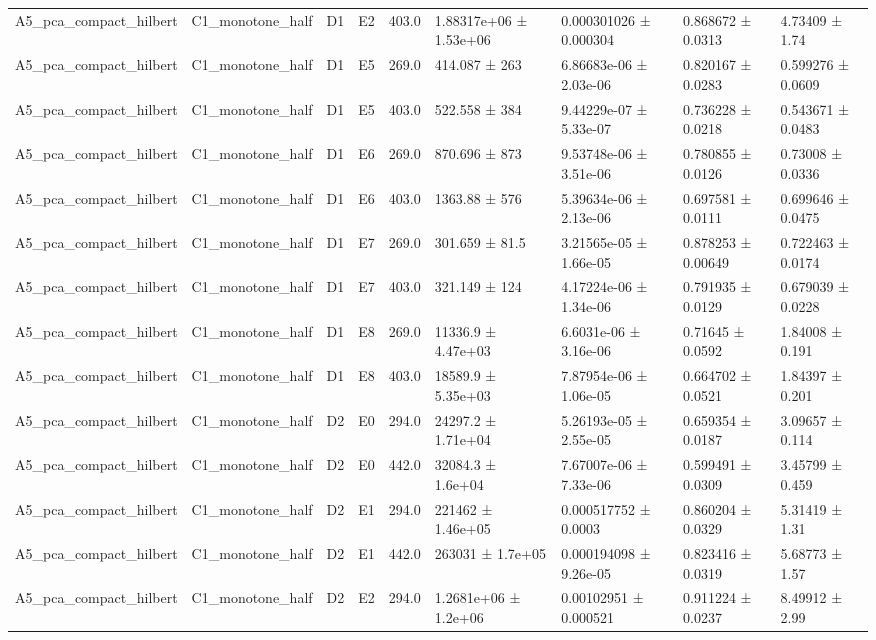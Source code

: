 \begin{table}
\begin{tabular}{lllllllll}
A5\_pca\_compact\_hilbert & C1\_monotone\_half & D1 & E2 & 403.0 & 1.88317e+06 ± 1.53e+06 & 0.000301026 ± 0.000304 & 0.868672 ± 0.0313 & 4.73409 ± 1.74 \\
A5\_pca\_compact\_hilbert & C1\_monotone\_half & D1 & E5 & 269.0 & 414.087 ± 263 & 6.86683e-06 ± 2.03e-06 & 0.820167 ± 0.0283 & 0.599276 ± 0.0609 \\
A5\_pca\_compact\_hilbert & C1\_monotone\_half & D1 & E5 & 403.0 & 522.558 ± 384 & 9.44229e-07 ± 5.33e-07 & 0.736228 ± 0.0218 & 0.543671 ± 0.0483 \\
A5\_pca\_compact\_hilbert & C1\_monotone\_half & D1 & E6 & 269.0 & 870.696 ± 873 & 9.53748e-06 ± 3.51e-06 & 0.780855 ± 0.0126 & 0.73008 ± 0.0336 \\
A5\_pca\_compact\_hilbert & C1\_monotone\_half & D1 & E6 & 403.0 & 1363.88 ± 576 & 5.39634e-06 ± 2.13e-06 & 0.697581 ± 0.0111 & 0.699646 ± 0.0475 \\
A5\_pca\_compact\_hilbert & C1\_monotone\_half & D1 & E7 & 269.0 & 301.659 ± 81.5 & 3.21565e-05 ± 1.66e-05 & 0.878253 ± 0.00649 & 0.722463 ± 0.0174 \\
A5\_pca\_compact\_hilbert & C1\_monotone\_half & D1 & E7 & 403.0 & 321.149 ± 124 & 4.17224e-06 ± 1.34e-06 & 0.791935 ± 0.0129 & 0.679039 ± 0.0228 \\
A5\_pca\_compact\_hilbert & C1\_monotone\_half & D1 & E8 & 269.0 & 11336.9 ± 4.47e+03 & 6.6031e-06 ± 3.16e-06 & 0.71645 ± 0.0592 & 1.84008 ± 0.191 \\
A5\_pca\_compact\_hilbert & C1\_monotone\_half & D1 & E8 & 403.0 & 18589.9 ± 5.35e+03 & 7.87954e-06 ± 1.06e-05 & 0.664702 ± 0.0521 & 1.84397 ± 0.201 \\
A5\_pca\_compact\_hilbert & C1\_monotone\_half & D2 & E0 & 294.0 & 24297.2 ± 1.71e+04 & 5.26193e-05 ± 2.55e-05 & 0.659354 ± 0.0187 & 3.09657 ± 0.114 \\
A5\_pca\_compact\_hilbert & C1\_monotone\_half & D2 & E0 & 442.0 & 32084.3 ± 1.6e+04 & 7.67007e-06 ± 7.33e-06 & 0.599491 ± 0.0309 & 3.45799 ± 0.459 \\
A5\_pca\_compact\_hilbert & C1\_monotone\_half & D2 & E1 & 294.0 & 221462 ± 1.46e+05 & 0.000517752 ± 0.0003 & 0.860204 ± 0.0329 & 5.31419 ± 1.31 \\
A5\_pca\_compact\_hilbert & C1\_monotone\_half & D2 & E1 & 442.0 & 263031 ± 1.7e+05 & 0.000194098 ± 9.26e-05 & 0.823416 ± 0.0319 & 5.68773 ± 1.57 \\
A5\_pca\_compact\_hilbert & C1\_monotone\_half & D2 & E2 & 294.0 & 1.2681e+06 ± 1.2e+06 & 0.00102951 ± 0.000521 & 0.911224 ± 0.0237 & 8.49912 ± 2.99 \\

\end{tabular}
\end{table}
